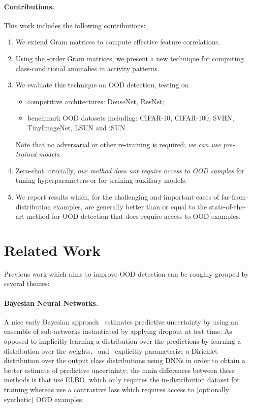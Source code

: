 \documentclass{article}
\begin{document}
\paragraph{Contributions.} This work includes the following contributions:
\begin{enumerate}
\item We extend Gram matrices to compute effective feature correlations.
\item Using the -order Gram matrices, we present a new technique for computing class-conditional anomalies in activity patterns.
\item We evaluate this technique on OOD detection, testing on
     \begin{itemize}[noitemsep,topsep=0pt,parsep=0pt,partopsep=0pt]
         \item competitive architectures: DenseNet, ResNet;
        \item benchmark OOD datasets including: CIFAR-10, CIFAR-100, SVHN, TinyImageNet, LSUN and iSUN.
         \end{itemize}
        Note that no adversarial or other re-training is required; {\it we can use pre-trained models}.
\item Zero-shot: crucially, {\em our method does not require access to OOD samples} for tuning hyperparameters or for training auxiliary models.
\item We report results which, for the challenging and important cases of far-from-distribution examples, are generally better than or equal to the state-of-the-art method for OOD detection  that does require access to OOD examples.


\end{enumerate}

\section{Related Work}
\label{s:related_work}

Previous work which aims to improve OOD detection can be roughly grouped by several themes:

\paragraph{Bayesian Neural Networks.}
A nice early Bayesian approach~\citep{gal2016dropout} estimates predictive uncertainty by using an ensemble of sub-networks instantiated by applying dropout at test time. As opposed to implicitly learning a distribution over the predictions by learning a distribution over the weights,~\cite{chen2019a} and~\cite{malinin2018predictive} explicitly parameterize a Dirichlet distribution over the output class distributions using DNNs in order to obtain a better estimate of predictive uncertainty; the main differences between these methods is that \cite{chen2019a} use ELBO, which only requires the in-distribution dataset for training whereas \cite{malinin2018predictive} use a contrastive loss which requires access to (optionally synthetic) OOD examples. 
\end{document}

